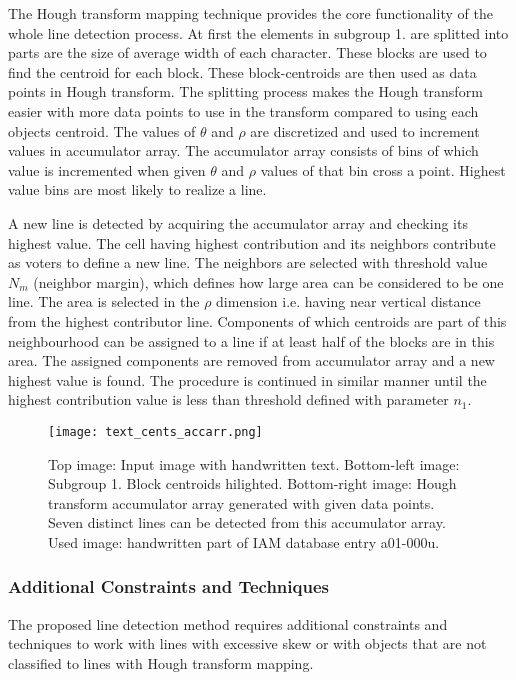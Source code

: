 \documentclass{article}
\begin{document}
            The Hough transform mapping technique provides the core functionality of the whole line detection process. At first the elements in subgroup 1. are splitted into parts are the size of average width of each character. These blocks are used to find the centroid for each block. These block-centroids are then used as data points in Hough transform. The splitting process makes the Hough transform easier with more data points to use in the transform compared to using each objects centroid. The values of $\theta$ and $\rho$ are discretized and used to increment values in accumulator array. The accumulator array consists of bins of which value is incremented when given $\theta$ and $\rho$ values of that bin cross a point. Highest value bins are most likely to realize a line.

            A new line is detected by acquiring the accumulator array and checking its highest value. The cell having highest contribution and its neighbors contribute as voters to define a new line. The neighbors are selected with threshold value $N_m$ (neighbor margin), which defines how large area can be considered to be one line. The area is selected in the $\rho$ dimension i.e. having near vertical distance from the highest contributor line. Components of which centroids are part of this neighbourhood can be assigned to a line if at least half of the blocks are in this area. The assigned components are removed from accumulator array and a new highest value is found. The procedure is continued in similar manner until the highest contribution value is less than threshold defined with parameter $n_1$.

            \begin{figure}[!ht]
              \centering
              \texttt{[image: text\_cents\_accarr.png]}
              \caption{Top image: Input image with handwritten text. Bottom-left image: Subgroup 1. Block centroids hilighted. Bottom-right image: Hough transform accumulator array generated with given data points. Seven distinct lines can be detected from this accumulator array. Used image: handwritten part of IAM database entry a01-000u. \label{fig:blockandacc} }
            \end{figure}

          \subsubsection{Additional Constraints and Techniques}
            The proposed line detection method requires additional constraints and techniques to work with lines with excessive skew or with objects that are not classified to lines with Hough transform mapping.
\end{document}
